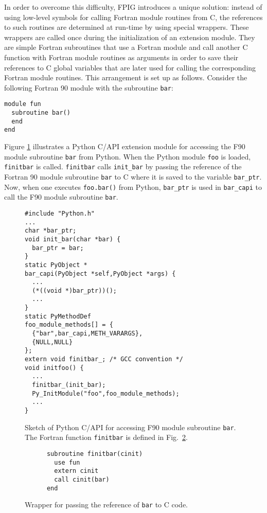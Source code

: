 \documentclass[twocolumn]{article}
\newcommand{\tthhide}[1]{#1}
\newcommand{\latexhide}[1]{}
\begin{document}
In order to overcome this difficulty, FPIG introduces a unique
solution: instead of using low-level symbols for calling Fortran
module routines from C, the references to such routines are determined
at run-time by using special wrappers. These wrappers are called once
during the initialization of an extension module. They are simple
Fortran subroutines that use a Fortran module and call another C
function with Fortran module routines as arguments in order to save
their references to C global variables that are later used for calling
the corresponding Fortran module routines. This arrangement is
set up as follows. Consider the following Fortran 90 module with the
subroutine \texttt{bar}:
\begin{verbatim}
module fun
  subroutine bar()
  end
end
\end{verbatim}
Figure \ref{fig:capi-sketch} illustrates a Python C/API extension
module for accessing the F90 module subroutine \texttt{bar} from Python.
When the Python module \texttt{foo} is loaded, \texttt{finitbar} is
called. \texttt{finitbar} calls \texttt{init\_bar} by passing the
reference of the Fortran 90 module subroutine \texttt{bar} to C where it is
saved to the variable \texttt{bar\_ptr}. Now, when one executes \texttt{foo.bar()}
from Python, \texttt{bar\_ptr} is used in \texttt{bar\_capi} to call
the F90 module subroutine \texttt{bar}.
\begin{figure}[htb]
  \latexhide{\label{fig:capi-sketch}}
\begin{verbatim}
#include "Python.h"
...
char *bar_ptr;
void init_bar(char *bar) {
  bar_ptr = bar;
}
static PyObject *
bar_capi(PyObject *self,PyObject *args) {
  ...
  (*((void *)bar_ptr))();
  ...
}
static PyMethodDef
foo_module_methods[] = {
  {"bar",bar_capi,METH_VARARGS},
  {NULL,NULL}
};
extern void finitbar_; /* GCC convention */
void initfoo() {
  ...
  finitbar_(init_bar);
  Py_InitModule("foo",foo_module_methods);
  ...
}
\end{verbatim}
  \caption{Sketch of Python C/API for accessing F90 module subroutine
    \texttt{bar}. The Fortran function \texttt{finitbar} is defined in
  Fig.~\ref{fig:wrapbar}.}
  \tthhide{\label{fig:capi-sketch}}
\end{figure}
\begin{figure}[ht]
  \latexhide{\label{fig:wrapbar}}
\begin{verbatim}
      subroutine finitbar(cinit)
        use fun
        extern cinit
        call cinit(bar)
      end
\end{verbatim}
  \caption{Wrapper for passing the reference of \texttt{bar} to C code.}
  \tthhide{\label{fig:wrapbar}}
\end{figure}
\end{document}
